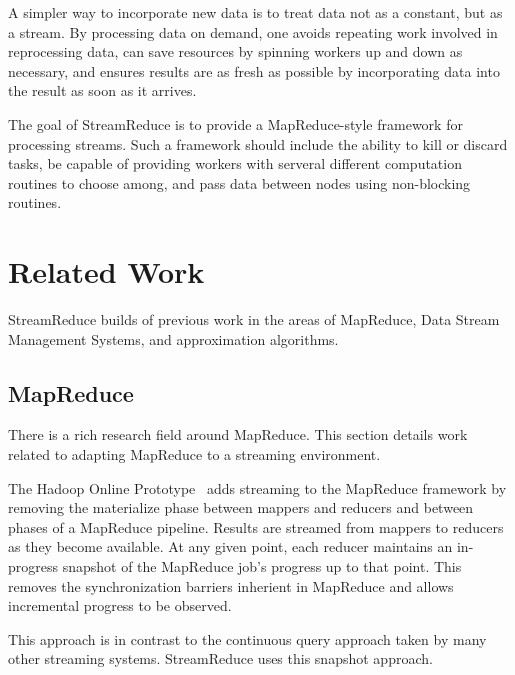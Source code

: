 \documentclass[12pt,twocolumn]{article}
\begin{document}
A simpler way to incorporate new data is to treat data not as a constant, but as a
stream. By processing data on demand, one avoids repeating work involved in reprocessing
data, can save resources
by spinning workers up and down as necessary, and ensures results are as fresh as possible
by incorporating data into the result as soon as it arrives.

The goal of StreamReduce is to provide a MapReduce-style framework for processing streams. Such a
framework should include the ability to kill or discard tasks, be capable of
providing workers with serveral different computation routines to choose among, and pass data
between nodes using non-blocking routines.

\section{Related Work}
\label{sec:relwork}
%

StreamReduce builds of previous work in the areas of MapReduce, Data Stream Management Systems,
and approximation algorithms.

\subsection{MapReduce}
There is a rich research field around MapReduce. This section details work related to adapting
MapReduce to a streaming environment.

The Hadoop Online Prototype~\cite{Condie:EECS-2009-136} adds streaming to the MapReduce framework
by removing the materialize phase between mappers and reducers and between phases of a
MapReduce pipeline. Results are streamed from mappers to reducers as they become available.
At any given point, each reducer maintains an in-progress snapshot of the MapReduce job's
progress up to that point. This removes the synchronization barriers inherient in MapReduce
and allows incremental progress to be observed.

This approach is in contrast to the continuous query approach taken by many other streaming
systems. StreamReduce uses this snapshot approach.
\end{document}
